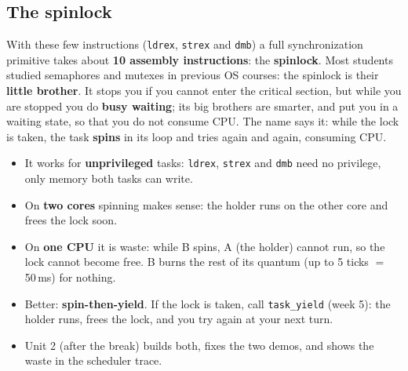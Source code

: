 \subsection{The spinlock}
With these few instructions (\texttt{ldrex}, \texttt{strex} and \texttt{dmb}) a full synchronization primitive takes about \textbf{10 assembly instructions}: the \textbf{spinlock}. Most students studied semaphores and mutexes in previous OS courses: the spinlock is their \textbf{little brother}. It stops you if you cannot enter the critical section, but while you are stopped you do \textbf{busy waiting}; its big brothers are smarter, and put you in a waiting state, so that you do not consume CPU. The name says it: while the lock is taken, the task \textbf{spins} in its loop and tries again and again, consuming CPU.
\begin{itemize}
    \item It works for \textbf{unprivileged} tasks: \texttt{ldrex}, \texttt{strex} and \texttt{dmb} need no privilege, only memory both tasks can write.
    \item On \textbf{two cores} spinning makes sense: the holder runs on the other core and frees the lock soon.
    \item On \textbf{one CPU} it is waste: while B spins, A (the holder) cannot run, so the lock cannot become free. B burns the rest of its quantum (up to 5 ticks $=$ 50\,ms) for nothing.
    \item Better: \textbf{spin-then-yield}. If the lock is taken, call \texttt{task\_yield} (week 5): the holder runs, frees the lock, and you try again at your next turn.
    \item Unit 2 (after the break) builds both, fixes the two demos, and shows the waste in the scheduler trace.
\end{itemize}

